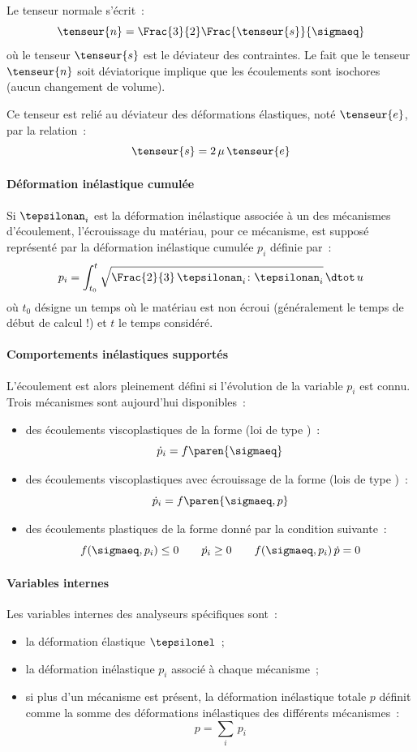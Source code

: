 \documentclass[rectoverso,pleiades,pstricks,leqno,anti]{texmf/note_technique_2010}
\begin{document}
Le tenseur normale s'écrit~:
\[
\tenseur{n} = \Frac{3}{2}\Frac{\tenseur{s}}{\sigmaeq}
\]
où le tenseur \(\tenseur{s}\) est le déviateur des contraintes. Le fait
que le tenseur \(\tenseur{n}\) soit déviatorique implique que les
écoulements sont isochores (aucun changement de volume).

Ce tenseur est relié au déviateur des déformations élastiques, noté
\(\tenseur{e}\), par la relation~:
\[
\tenseur{s}=2\,\mu\,\tenseur{e}
\]

\paragraph{Déformation inélastique cumulée} Si \(\tepsilonan_{i}\) est
la déformation inélastique associée à un des mécanismes d'écoulement,
l'écrouissage du matériau, pour ce mécanisme, est supposé représenté par
la déformation inélastique cumulée \(p_{i}\) définie par~:
\[
p_{i}=\int_{t_{0}}^{t}\sqrt{\Frac{2}{3}\,\tepsilonan_{i}\colon\tepsilonan_{i}}\,\dtot\,u
\]
où \(t_{0}\) désigne un temps où le matériau est non écroui
(généralement le temps de début de calcul !) et \(t\) le temps
considéré.

\paragraph{Comportements inélastiques supportés}
L'écoulement est alors pleinement défini si l'évolution de la variable
\(p_{i}\) est connu. Trois mécanismes sont aujourd'hui disponibles~:
\begin{itemize}
  \item des écoulements viscoplastiques de la forme (loi de type
  )~:
  \[
  \dot{p}_{i} = f\paren{\sigmaeq}
  \]
  \item des écoulements viscoplastiques avec écrouissage de la forme
  (lois de type )~:
\[
\dot{p}_{i} = f\paren{\sigmaeq,p}
\]
\item des écoulements plastiques de la forme donné par la condition suivante~:
\[
f(\sigmaeq,p_{i})\leq 0 \quad\quad \dot{p_{i}}\geq 0 \quad\quad
f(\sigmaeq,p_{i})\,\dot{p} = 0
\]
\end{itemize}

\paragraph{Variables internes} Les variables internes des analyseurs
spécifiques sont~:
\begin{itemize}
  \item la déformation élastique \(\tepsilonel\)~;
  \item la déformation inélastique \(p_{i}\) associé à chaque
  mécanisme~;
  \item si plus d'un mécanisme est présent, la déformation inélastique
  totale \(p\) définit comme la somme des déformations inélastiques des
  différents mécanismes~:
  \[
  p = \displaystyle\sum_{i}\,p_{i}
  \]
\end{itemize}
\end{document}
